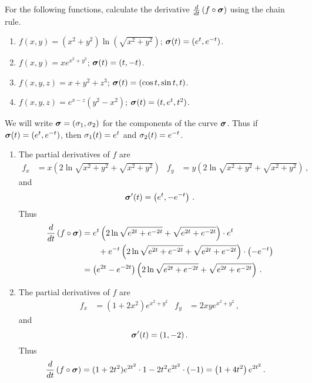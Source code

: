 \begin{question}
For the following functions, calculate the derivative $\frac{d}{dt}\left(f \circ \bm{\sigma} \right)$ using the chain rule.
\begin{enumerate}
\item
$f(x,y) = (x^2+y^2)\ln\left(\sqrt{x^2+y^2}\right)$;
$\bm{\sigma}(t) = (e^t, e^{-t})$.
\item
$f(x,y) = xe^{x^2+y^2}$;
$\bm{\sigma}(t) = (t,-t)$.
\item
$f(x,y,z) = x+y^2+z^3$;
$\bm{\sigma}(t) = (\cos t, \sin t, t)$.
\item
$f(x,y,z) = e^{x-z}(y^2-x^2)$;
$\bm{\sigma}(t) = (t, e^t, t^2)$.
\end{enumerate}
\end{question}

\begin{solution}
We will write $\bm {\sigma} = (\sigma_1, \sigma_2)$ for the components of the curve $\bm {\sigma}$. Thus if $\bm {\sigma}(t) = (e^t, e^{-t})$, then $\sigma_1(t) = e^t$ and $\sigma_2(t) = e^{-t}$.
\begin{enumerate}
\item
The partial derivatives of $f$ are
\begin{align*}
f_x &= x \left( 2 \ln \sqrt{x^2+y^2} +\sqrt{x^2+y^2} \right) &
f_y &= y \left( 2 \ln \sqrt{x^2+y^2} +\sqrt{x^2+y^2} \right)\,,
\end{align*}
and
\[
\bm {\sigma}'(t) = \left(e^t, -e^{-t}\right)\,.
\]
Thus
\begin{align*}
\frac{d}{dt}\left(f \circ \bm {\sigma}\right) &=
e^t \left( 2 \ln \sqrt{ e^{2t} + e^{-2t}} + \sqrt{ e^{2t} + e^{-2t}} \right) \cdot e^t \\
&\qquad{} +
e^{-t} \left( 2 \ln \sqrt{ e^{2t} + e^{-2t}} + \sqrt{ e^{2t} + e^{-2t}} \right) \cdot \left(-e^{-t}\right) \\
&= \left(e^{2t}-e^{-2t}\right) \left(2\ln \sqrt{e^{2t}+e^{-2t}} + \sqrt{e^{2t}+e^{-2t}} \right)\,.
\end{align*}

\item
The partial derivatives of $f$ are
\begin{align*}
f_x &= (1 + 2x^2)e^{x^2+y^2} &
f_y &= 2xy e^{x^2+y^2}\,,
\end{align*}
and
\[
\bm {\sigma}'(t) = (1,-2)\,.
\]
Thus
\begin{align*}
\frac{d}{dt}\left(f \circ \bm {\sigma}\right) &=
 (1 + 2t^2)e^{2t^2} \cdot 1 - 2t^2 e^{2t^2} \cdot (-1) = \left( 1 + 4t^2 \right) e^{2t^2} \,.
\end{align*}


\end{enumerate}
\end{solution}
